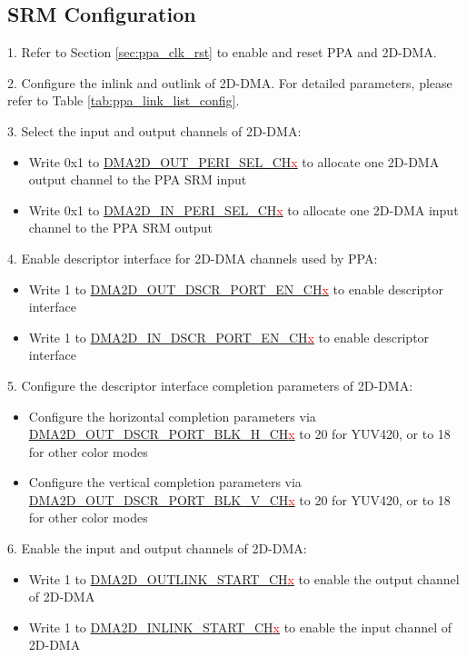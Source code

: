 \documentclass[main\_\_EN.tex]{subfiles}
\begin{document}
\subsection{SRM Configuration}

1. Refer to Section \ref{sec:ppa_clk_rst} to enable and reset PPA and 2D-DMA.

2. Configure the inlink and outlink of 2D-DMA. For detailed parameters, please refer to Table \ref{tab:ppa_link_list_config}.

3. Select the input and output channels of 2D-DMA:
\begin{itemize}
    \item Write 0x1 to \hyperref[fielddesc:DMA2DOUTPERISELCHN]{DMA2D\_OUT\_PERI\_SEL\_CH\textcolor{red}{x}} to allocate one 2D-DMA output channel to the PPA SRM input
    \item Write 0x1 to \hyperref[fielddesc:DMA2DINPERISELCHN]{DMA2D\_IN\_PERI\_SEL\_CH\textcolor{red}{x}} to allocate one 2D-DMA input channel to the PPA SRM output
\end{itemize}

4. Enable descriptor interface for 2D-DMA channels used by PPA:
\begin{itemize}
    \item Write 1 to \hyperref[fielddesc:DMA2DOUTDSCRPORTENCHN]{DMA2D\_OUT\_DSCR\_PORT\_EN\_CH\textcolor{red}{x}}  to enable descriptor interface
    \item Write 1 to \hyperref[fielddesc:DMA2DINDSCRPORTENCHN]{DMA2D\_IN\_DSCR\_PORT\_EN\_CH\textcolor{red}{x}}  to enable descriptor interface
\end{itemize}

5. Configure the descriptor interface completion parameters of 2D-DMA:
\begin{itemize}
    \item Configure the horizontal completion parameters via \hyperref[fielddesc:DMA2DOUTDSCRPORTBLKHCHN]{DMA2D\_OUT\_DSCR\_PORT\_BLK\_H\_CH\textcolor{red}{x}} to 20 for YUV420, or to 18 for other color modes
    \item Configure the vertical completion parameters via \hyperref[fielddesc:DMA2DOUTDSCRPORTBLKVCHN]{DMA2D\_OUT\_DSCR\_PORT\_BLK\_V\_CH\textcolor{red}{x}} to 20 for YUV420, or to 18 for other color modes
\end{itemize}

6. Enable the input and output channels of 2D-DMA:
\begin{itemize}
    \item Write 1 to \hyperref[fielddesc:DMA2DOUTLINKSTARTCHN]{DMA2D\_OUTLINK\_START\_CH\textcolor{red}{x}} to enable the output channel of 2D-DMA
    \item Write 1 to \hyperref[fielddesc:DMA2DINLINKSTARTCHN]{DMA2D\_INLINK\_START\_CH\textcolor{red}{x}} to enable the input channel of 2D-DMA
\end{itemize}
\end{document}
